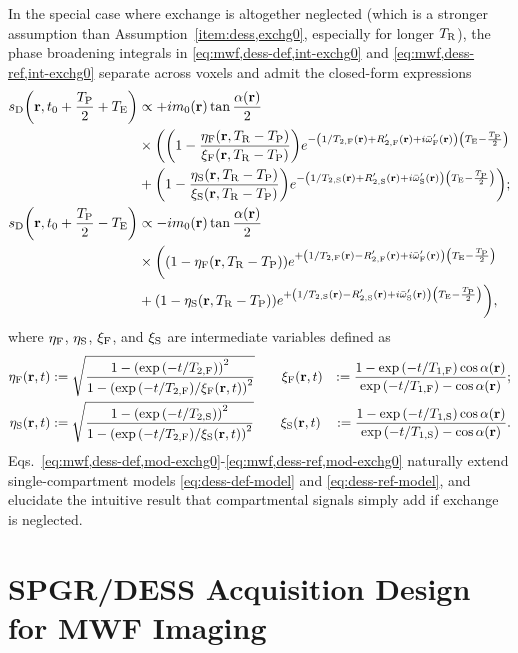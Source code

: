 In the special case
where exchange is altogether neglected
(which is a stronger assumption
than Assumption~\ref{item:dess,exchg0},
especially for longer $T_\mathrm{R}$),
the phase broadening integrals 
in \eqref{eq:mwf,dess-def,int-exchg0} and \eqref{eq:mwf,dess-ref,int-exchg0}
separate across voxels
and admit the closed-form expressions
\begin{align}
	\dess\paren{\bmr,t_0+\frac{\TP}{2}+\TE} &\propto
		+i\mzero\pr \tan{\frac{\flip\pr}{2}} 
		\label{eq:mwf,dess-def,mod-exchg0} \\
	&\times 
		\bigg(
			\paren{1-\frac{\etaf\paren{\bmr,\TR-\TP}}{\xif\paren{\bmr,\TR-\TP}}}
			e^{-\paren{1/\tf{2}\pr+\Rtpf\pr+i\ompfmed\pr}\paren{\TE-\frac{\TP}{2}}}
			\nonumber \\
	&+	
			\paren{1-\frac{\etas\paren{\bmr,\TR-\TP}}{\xis\paren{\bmr,\TR-\TP}}}
			e^{-\paren{1/\ts{2}\pr+\Rtps\pr+i\ompsmed\pr}\paren{\TE-\frac{\TP}{2}}}
		\bigg);
		\nonumber \\
	\dess\paren{\bmr,t_0+\frac{\TP}{2}-\TE} &\propto
		-i\mzero\pr \tan{\frac{\flip\pr}{2}}
		\label{eq:mwf,dess-ref,mod-exchg0} \\
	&\times
		\bigg(
			\paren{1-\etaf\paren{\bmr,\TR-\TP}}
			e^{+\paren{1/\tf{2}\pr-\Rtpf\pr+i\ompfmed\pr}\paren{\TE-\frac{\TP}{2}}}
			\nonumber \\
	&+
			\paren{1-\etas\paren{\bmr,\TR-\TP}}
			e^{+\paren{1/\ts{2}\pr-\Rtps\pr+i\ompsmed\pr}\paren{\TE-\frac{\TP}{2}}}
		\bigg),
		\nonumber
\end{align}
where $\eta_{\mathrm{F}}$, $\eta_{\mathrm{S}}$, $\xi_{\mathrm{F}}$, and $\xi_{\mathrm{S}}$ 
are intermediate variables defined as
\begin{align}
	\etaf\prt &:=
		\sqrt{\frac{1-\paren{\expa{-t/\tf{2}}}^2}{1-\paren{\expa{-t/\tf{2}}/\xif\prt}^2}}
		\qquad
	\xif\prt &:=
		\frac{1-\expa{-t/\tf{1}}\cos{\flip\pr}}{\expa{-t/\tf{1}}-\cos{\flip\pr}};
		\nonumber \\
	\etas\prt &:=
		\sqrt{\frac{1-\paren{\expa{-t/\ts{2}}}^2}{1-\paren{\expa{-t/\tf{2}}/\xis\prt}^2}}
		\qquad
	\xis\prt &:=
		\frac{1-\expa{-t/\ts{1}}\cos{\flip\pr}}{\expa{-t/\ts{1}}-\cos{\flip\pr}}.
		\nonumber
\end{align}
Eqs.~\eqref{eq:mwf,dess-def,mod-exchg0}-\eqref{eq:mwf,dess-ref,mod-exchg0}
naturally extend single-compartment models
\eqref{eq:dess-def-model} and \eqref{eq:dess-ref-model},
and elucidate the intuitive result
that compartmental signals simply add
if exchange is neglected.

\section{SPGR/DESS Acquisition Design for MWF Imaging}
\label{s,mwf,acq}

